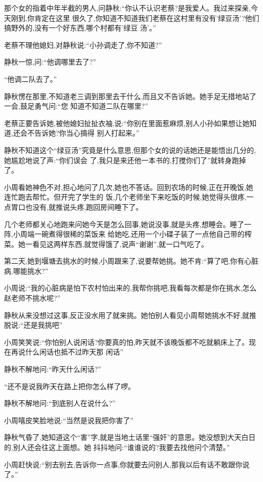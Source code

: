 ﻿\documentclass[12pt]{article}
\begin{document}
那个女的指着中年半截的男人,问静秋:``你认不认识老蔡?是我爱人。我过来探亲,今天刚到,你肯定\myrule 在这里
很久了,你知道不知道我们老蔡在这村里有没有'绿豆汤'?他们搞野外的,没有一个好东西,哪个村都有\myrule '绿豆
汤'。''

老蔡不理他媳妇,对静秋说:``小孙调走了,你不知道?''

静秋一惊,问:``他调哪里去了?''

``他调二队去了。''

静秋愣在那里,不知道老三调到那里去干什么,而且又不告诉她。她手足无措地站了一会,鼓足勇气问:``您\myrule 
知道不知道\myrule 二队在哪里?''


老蔡正要告诉她,被他媳妇扯扯衣袖,说:``你别在里面惹麻烦,别人小孙如果想让她知道,还会不告诉她?你当心搞得
别人打起来。''

静秋不知道这个``绿豆汤''究竟是什么意思,但那个女的说的话她还是能悟出几分的,她尴尬地说了声:``你们误会
了,我只是来还他一本书的,打搅你们了\myrule ''就转身跑掉了。

小周看她神色不对,担心地问了几次,她也不答话。回到农场的时候,正在开晚饭,她连忙跑去帮忙。但开完了学生的
饭,几个老师坐下来吃饭的时候,她觉得头很疼,一点胃口也没有,就推说头疼,跑回房间睡下了。

几个老师都关心地跑来问她今天是怎么回事,她说没事,就是头疼,想睡会。睡了一阵,小周端一碗煮得很稀的菜饭来
给她吃,还用一个小碟子装了一点他自己带的榨菜。她一看见这两样东西,就觉得饿了,说声``谢谢'',就一口气吃了。

第二天,她到堰塘去挑水的时候,小周跟来了,说要帮她挑。她不肯:``算了吧,你有心脏病,哪能挑水?''

小周说:``我的心脏病是怕下农村怕出来的,我帮你挑吧,我看每次都是你在挑水,怎么赵老师不挑水呢?''

静秋从来没想过这事,反正没水用了就来挑。她怕别人看见小周帮她挑水不好,就推脱说:``还是我挑吧\myrule ''

小周笑笑说:``你怕别人说闲话?你要真的怕,昨天就不该晚饭都不吃就躺床上了。现在再说什么闲话也抵不过昨天那
闲话\myrule ''

静秋不解地问:``昨天什么闲话?''

``还不是说我昨天在路上把你怎么样了啰。

静秋不解地问:``到底别人在说什么?''

小周嘻皮笑脸地说:``当然是说我把你害了\myrule ''

静秋气昏了,她知道这个``害''字,就是当地土话里``强奸''的意思。她没想到大天白日的,别人还会往这上面想。她
抖抖地问:``谁\myrule 谁说的?我要去找他问个清楚。''

小周赶快说:``别去别去,告诉你一点事,你就要去问别人,那我以后有话不敢跟你说了。''
\end{document}
